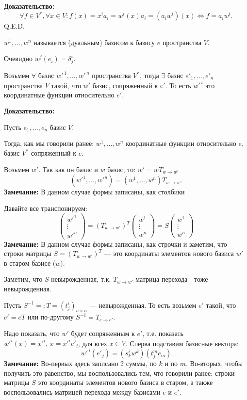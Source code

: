 \textbf{Доказательство:}
$$\forall f \in V^*, \forall x \in V: f(x) = x^ia_i = w^i(x)a_i = (a_iw^i)(x) \Leftrightarrow f = a_iw^i.$$
\hfill Q.E.D.


 $w^1,\ldots, w^n$ называется  (дуальным) базисом к базису $e$ пространства $V$.

Очевидно $w^j(e_i) = \delta^i_j$.


Возьмем $\forall$ базис $w'^{\,1},\ldots, w'^{\,n}$ пространства $V^*$, тогда $\exists$ базис $e'_1, \ldots, e'_n$ пространства $V$ такой, что $w'$ базис, сопряженный к $e'$. То есть $w'^{\,i} $ это координатные функции относительно $e'$.

\textbf{Доказательство:}


Пусть $e_1,\dots ,e_n \text{ базис } V$.

Тогда, как мы говорили ранее:
$ w^1,\dots,w^n $ координатные функции относительно $e$, базис $V^*$ сопряженный к $e$.

Возьмем $w'$. Так как он базис и $w$ базис, то:  $w' =wT_{w \rightarrow w'}$
$$(w'^1,\ldots,w'^n)=(w^1,\ldots,w^n)T_{w \to w'}$$
\textbf{Замечание:} В данном случае формы записаны, как столбики 

Давайте все транспонируем:
$$\begin{pmatrix}
    w'^1 \\
    \vdots \\
    {w'}^n
\end{pmatrix} = (T_{w \to w'})^T \begin{pmatrix}
    w^1 \\
    \vdots \\
    {w}^n
\end{pmatrix}= S \begin{pmatrix}
    w^1 \\
    \vdots \\
    {w}^n
\end{pmatrix}$$
\textbf{Замечание:} В данном случае формы записаны, как строчки и заметим, что строки матрицы $S = (T_{w \to w'})^T$ --- это координаты элементов нового базиса $w'$ в старом базисе ($w$).

Заметим, что $S$ невырожденная, т.к. $T_{w \to w'}$ матрица перехода - тоже невырожденная.

Пусть $S^{-1}=:T=(t^i_j)_{n \times n}$ --- невырожденная.  То есть возьмем $e'$ такой, что $e' = e T$ или по-другому $S^{-1} =T_{e\rightarrow e'}$.


Надо показать, что $w'$ будет сопряженным к $e'$, т.е. показать ${w'}^{ i}(x)={x'}^i, \, x = {x'}^i {e'}_i$, для всех $ x \in V$. Сперва подставим базисные  вектора:
$$w'^{\, i}(e'_j)  = (s^i_k w^k)(t_j^me_m) $$
\textbf{Замечание:} Во-первых здесь  записано 2 суммы, по $k$ и по $m$. Во-вторых, чтобы получить это равенство, мы воспользовались тем, что говорили ранее: строки матрицы $S$ это координаты элементов нового базиса в старом, а также воспользовались матрицей перехода между базисами $e$ и $e'$.

